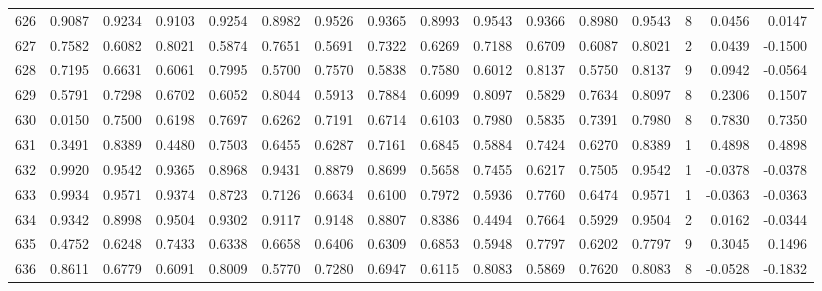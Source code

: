 \begin{tabular}{lrrrrrrrrrrrrrrr}
626 &      0.9087 &  0.9234 &  0.9103 &  0.9254 &  0.8982 &  0.9526 &  0.9365 &  0.8993 &  0.9543 &  0.9366 &   0.8980 &     0.9543 &      8 &                    0.0456 &                     0.0147 \\
627 &      0.7582 &  0.6082 &  0.8021 &  0.5874 &  0.7651 &  0.5691 &  0.7322 &  0.6269 &  0.7188 &  0.6709 &   0.6087 &     0.8021 &      2 &                    0.0439 &                    -0.1500 \\
628 &      0.7195 &  0.6631 &  0.6061 &  0.7995 &  0.5700 &  0.7570 &  0.5838 &  0.7580 &  0.6012 &  0.8137 &   0.5750 &     0.8137 &      9 &                    0.0942 &                    -0.0564 \\
629 &      0.5791 &  0.7298 &  0.6702 &  0.6052 &  0.8044 &  0.5913 &  0.7884 &  0.6099 &  0.8097 &  0.5829 &   0.7634 &     0.8097 &      8 &                    0.2306 &                     0.1507 \\
630 &      0.0150 &  0.7500 &  0.6198 &  0.7697 &  0.6262 &  0.7191 &  0.6714 &  0.6103 &  0.7980 &  0.5835 &   0.7391 &     0.7980 &      8 &                    0.7830 &                     0.7350 \\
631 &      0.3491 &  0.8389 &  0.4480 &  0.7503 &  0.6455 &  0.6287 &  0.7161 &  0.6845 &  0.5884 &  0.7424 &   0.6270 &     0.8389 &      1 &                    0.4898 &                     0.4898 \\
632 &      0.9920 &  0.9542 &  0.9365 &  0.8968 &  0.9431 &  0.8879 &  0.8699 &  0.5658 &  0.7455 &  0.6217 &   0.7505 &     0.9542 &      1 &                   -0.0378 &                    -0.0378 \\
633 &      0.9934 &  0.9571 &  0.9374 &  0.8723 &  0.7126 &  0.6634 &  0.6100 &  0.7972 &  0.5936 &  0.7760 &   0.6474 &     0.9571 &      1 &                   -0.0363 &                    -0.0363 \\
634 &      0.9342 &  0.8998 &  0.9504 &  0.9302 &  0.9117 &  0.9148 &  0.8807 &  0.8386 &  0.4494 &  0.7664 &   0.5929 &     0.9504 &      2 &                    0.0162 &                    -0.0344 \\
635 &      0.4752 &  0.6248 &  0.7433 &  0.6338 &  0.6658 &  0.6406 &  0.6309 &  0.6853 &  0.5948 &  0.7797 &   0.6202 &     0.7797 &      9 &                    0.3045 &                     0.1496 \\
636 &      0.8611 &  0.6779 &  0.6091 &  0.8009 &  0.5770 &  0.7280 &  0.6947 &  0.6115 &  0.8083 &  0.5869 &   0.7620 &     0.8083 &      8 &                   -0.0528 &                    -0.1832 \\

\end{tabular}
